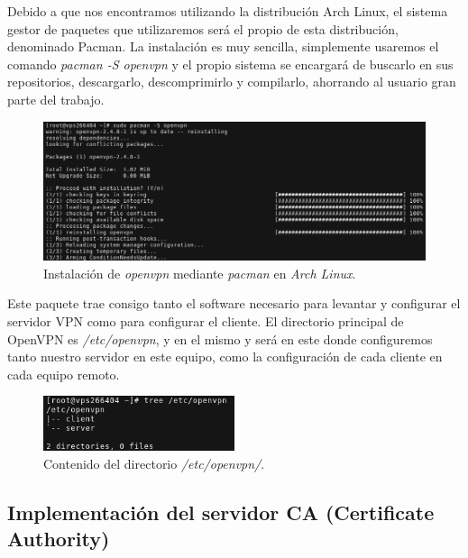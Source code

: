 \documentclass[a4paper, 11pt, titlepage]{article}
\begin{document}
        Debido a que nos encontramos utilizando la distribución Arch Linux, el sistema gestor de paquetes que utilizaremos será el propio de esta distribución, 
        denominado Pacman. La instalación es muy sencilla, simplemente usaremos el comando \textit{pacman -S openvpn} y el propio sistema se encargará de buscarlo
        en sus repositorios, descargarlo, descomprimirlo y compilarlo, ahorrando al usuario gran parte del trabajo.
        
        \begin{figure}[htp]
            \centering
            \includegraphics[width=1\textwidth]{resources/openvpn02.png}
            \caption{Instalación de \textit{openvpn} mediante \textit{pacman} en \textit{Arch Linux}.}
            \label{tuntap02}
        \end{figure}
        
        Este paquete trae consigo tanto el software necesario para levantar y configurar el servidor VPN como para configurar el cliente. El directorio 
        principal de OpenVPN es \textit{/etc/openvpn}, y en el mismo y será en este donde configuremos tanto nuestro servidor en este equipo, como la configuración
        de cada cliente en cada equipo remoto.
        
        \begin{figure}[htp]
            \centering
            \includegraphics[width=0.5\textwidth]{resources/openvpn03.png}
            \caption{Contenido del directorio \textit{/etc/openvpn/}.}
            \label{tuntap02}
        \end{figure}

    \subsection{Implementación del servidor CA (Certificate Authority)}
\end{document}
